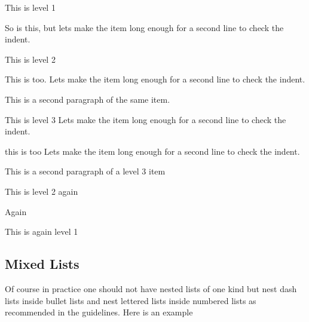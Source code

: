 \begin{alphenum}
\typeout{\theenumi}
  \item This is level 1
  \item So is this, but lets make the item long enough for a second
        line to check the indent. 
  \begin{alphenum}
    \item This is level 2
    \item This is too.  Lets make the item long enough for a second
          line to check the indent. 

          This is a second paragraph of the same item.
    \begin{alphenum}
      \item This is level 3 Lets make the item long enough for a
            second line to check the indent.
      \item this is too Lets make the item long enough for a second
            line  to check the indent.

            This is a second paragraph of a level 3 item
    \end{alphenum}
    \item This is level 2 again
    \begin{alphenum}
      \item Again
    \end{alphenum}
  \end{alphenum}
  \item This is again level 1
\end{alphenum}

\subsection{Mixed Lists}


Of course in practice one should not have nested lists of one kind but
nest dash  lists inside bullet lists and nest lettered lists inside
numbered lists as recommended in the guidelines. Here is an example

